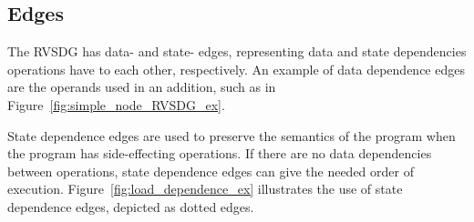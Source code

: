 \subsection{Edges}

The RVSDG has data- and state- edges, representing data and state dependencies
operations have to each other, respectively. An example of data dependence edges
are the operands used in an addition, such as in
Figure~\ref{fig:simple_node_RVSDG_ex}.

State dependence edges are used to preserve the semantics of the program when
the program has side-effecting operations. If there are no data dependencies
between operations, state dependence edges can give the needed order of
execution. Figure~\ref{fig:load_dependence_ex} illustrates the use of state
dependence edges, depicted as dotted edges.

